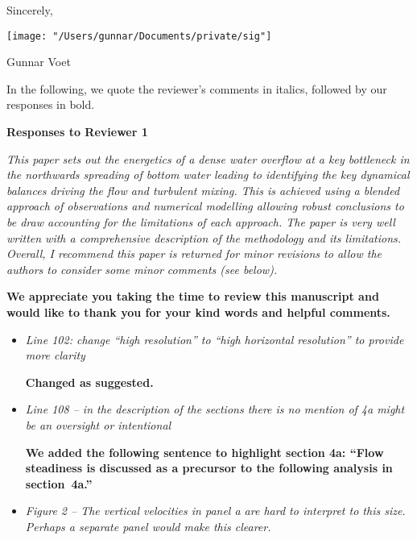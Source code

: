 \documentclass[11pt]{article}
\begin{document}
\begin{flushleft}
Sincerely,

\texttt{[image: "/Users/gunnar/Documents/private/sig"]}


Gunnar Voet

\clearpage
In the following, we quote the reviewer's comments in italics, followed by our responses in bold.\\
\vspace{0.2in}

\centerline{\textbf{ Responses to Reviewer 1}}
\vspace{0.05in}



\it
This paper sets out the energetics of a dense water overflow at a key bottleneck in the northwards spreading of bottom water leading to identifying the key dynamical balances driving the flow and turbulent mixing. This is achieved using a blended approach of observations and numerical modelling allowing robust conclusions to be draw accounting for the limitations of each approach. The paper is very well written with a comprehensive description of the methodology and its limitations. Overall, I recommend this paper is returned for minor revisions to allow the authors to consider some minor comments (see below).

\vspace{0.05in}
\textbf{We appreciate you taking the time to review this manuscript and would like to thank you for your kind words and helpful comments.}

\begin{itemize}
\item \textit{Line 102: change ``high resolution'' to ``high horizontal resolution'' to provide more clarity}

\textbf{Changed as suggested.}

\item \textit{Line 108 -- in the description of the sections there is no mention of 4a might be an oversight or intentional}

\textbf{We added the following sentence to highlight section 4a: ``Flow steadiness is discussed as a precursor to the following analysis in section~4a.''}

\item \textit{Figure 2 -- The vertical velocities in panel a are hard to interpret to this size. Perhaps a separate panel would make this clearer.}


\end{itemize}
\end{flushleft}
\end{document}
